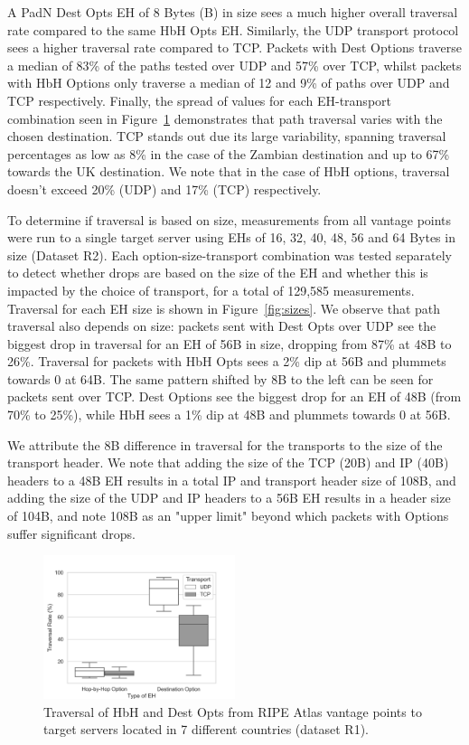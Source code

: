 \documentclass[conference]{IEEEtran}
\begin{document}
A PadN Dest Opts EH of 8 Bytes (B) in size sees a much higher overall traversal rate compared to the same HbH Opts EH. Similarly, the UDP transport protocol sees a higher traversal rate compared to TCP. Packets with Dest Options traverse a median of 83\% of the paths tested over UDP and 57\% over TCP, whilst packets with HbH Options only traverse a median of 12 and 9\% of paths over UDP and TCP respectively.
Finally, the spread of values for each EH-transport combination seen in Figure~\ref{fig:countrybox} demonstrates that path traversal varies with the chosen destination. TCP stands out due its large variability, spanning traversal percentages as low as 8\% in the case of the Zambian destination and up to 67\% towards the UK destination. We note that in the case of HbH options, traversal doesn't exceed 20\% (UDP) and 17\% (TCP) respectively.

To determine if traversal is based on size, measurements from all vantage points were run to a single target server using EHs of 16, 32, 40, 48, 56 and 64 Bytes in size (Dataset R2). Each option-size-transport combination was tested separately to detect whether drops are based on the size of the EH and whether this is impacted by the choice of transport, for a total of 129,585 measurements.
Traversal for each EH size is shown in Figure~\ref{fig:sizes}. We observe that path traversal also depends on size: packets sent with Dest Opts over UDP see the biggest drop in traversal for an EH of 56B in size, dropping from 87\% at 48B to 26\%. Traversal for packets with HbH Opts sees a 2\% dip at 56B and plummets towards 0 at 64B.
The same pattern shifted by 8B to the left can be seen for packets sent over TCP. Dest Options see the biggest drop for an EH of 48B (from 70\% to 25\%), while HbH sees a 1\% dip at 48B and plummets towards 0 at 56B.

We attribute the 8B difference in traversal for the transports to the size of the transport header.
We note that adding the size of the TCP (20B) and IP (40B) headers to a 48B EH results in a total IP and transport header size of 108B, and adding the size of the UDP and IP headers to a 56B EH results in a header size of 104B, and note 108B as an "upper limit" beyond which packets with Options suffer significant drops.

\begin{figure}
\centering
  \includegraphics[width=0.5\textwidth]{all_traversal.png}
  \caption{Traversal of HbH and Dest Opts from RIPE Atlas vantage points to target servers located in 7 different countries (dataset R1). }
  \label{fig:countrybox}
\end{figure}
\end{document}
